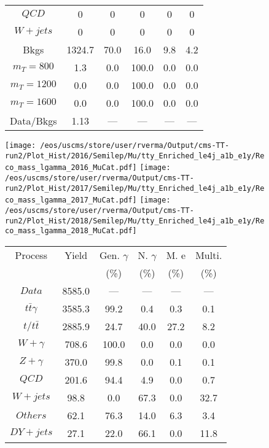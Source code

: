 \begin{figure}
\begin{minipage}[c]{0.32\textwidth}
{\begin{tabular}{cccccc}
$ QCD $ &  0 &  0 &  0 &  0 &  0\\
$ W+jets $ &  0 &  0 &  0 &  0 &  0\\
Bkgs &  1324.7 &  70.0 &  16.0 &  9.8 &  4.2\\
$ m_{T} = 800 $ &  1.3 &  0.0 &  100.0 &  0.0 &  0.0\\
$ m_{T} = 1200 $ &  0.0 &  0.0 &  100.0 &  0.0 &  0.0\\
$ m_{T} = 1600 $ &  0.0 &  0.0 &  100.0 &  0.0 &  0.0\\
Data/Bkgs &  1.13 &  --- &  --- &  --- &  ---\\
\hline
\end{tabular}
}
\end{minipage}
\end{figure}

\begin{figure}
\centering
\texttt{[image: /eos/uscms/store/user/rverma/Output/cms-TT-run2/Plot\_Hist/2016/Semilep/Mu/tty\_Enriched\_le4j\_a1b\_e1y/Reco\_mass\_lgamma\_2016\_MuCat.pdf]}
\texttt{[image: /eos/uscms/store/user/rverma/Output/cms-TT-run2/Plot\_Hist/2017/Semilep/Mu/tty\_Enriched\_le4j\_a1b\_e1y/Reco\_mass\_lgamma\_2017\_MuCat.pdf]}
\texttt{[image: /eos/uscms/store/user/rverma/Output/cms-TT-run2/Plot\_Hist/2018/Semilep/Mu/tty\_Enriched\_le4j\_a1b\_e1y/Reco\_mass\_lgamma\_2018\_MuCat.pdf]}
\begin{minipage}[c]{0.32\textwidth}
\centering
\tiny{
\begin{tabular}{cccccc}
\hline
Process & Yield & Gen. $\gamma$ & N. $\gamma$ & M. e & Multi. \\
 &  & (\%) & (\%) & (\%) & (\%)  \\
\hline
                                                                      $ Data $ &  8585.0 &  --- &  --- &  --- &  ---\\
$ t\bar{t}\gamma $ &  3585.3 &  99.2 &  0.4 &  0.3 &  0.1\\
$ t/t\bar{t} $ &  2885.9 &  24.7 &  40.0 &  27.2 &  8.2\\
$ W+\gamma $ &  708.6 &  100.0 &  0.0 &  0.0 &  0.0\\
$ Z+\gamma $ &  370.0 &  99.8 &  0.0 &  0.1 &  0.1\\
$ QCD $ &  201.6 &  94.4 &  4.9 &  0.0 &  0.7\\
$ W+jets $ &  98.8 &  0.0 &  67.3 &  0.0 &  32.7\\
$ Others $ &  62.1 &  76.3 &  14.0 &  6.3 &  3.4\\
$ DY+jets $ &  27.1 &  22.0 &  66.1 &  0.0 &  11.8\\

\end{tabular}}
\end{minipage}
\end{figure}

